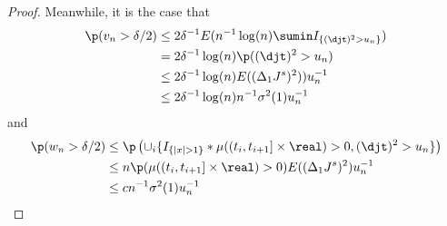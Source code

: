 \begin{proof}
  Meanwhile, it is the case that \begin{align} \p(v_n > \delta /2) & \le 2\delta^{-1}E(n^{-1} \log(n) \sumin I_{\{(\djt)^2 > u_n\}}) \notag \\ & = 2\delta^{-1}\log(n) \p( (\djt)^2 > u_n) \notag \\ &\le  2\delta^{-1}\log(n) E((\Delta_1 J^s)^2))u_n^{-1}  \notag \\ &\le 2\delta^{-1} \log(n) n^{-1}\sigma^2(1)u_n^{-1}\notag \end{align}  and \begin{align} \p(w_n > \delta/2) & \le \p\left(\cup_i\{I_{\{\vert x \vert > 1\}}\ast \mu( (t_i, t_{i + 1}] \times \real) > 0   , (\djt)^2 > u_n\}\right) \notag \\ & \le n \p(\mu( (t_i, t_{i + 1}] \times \real) > 0 ) E( (\Delta_1 J^s)^2) u_n^{-1} \notag \\ & \le c n^{-1} \sigma^2(1) u_n^{-1}\notag \end{align} 
\end{proof}

